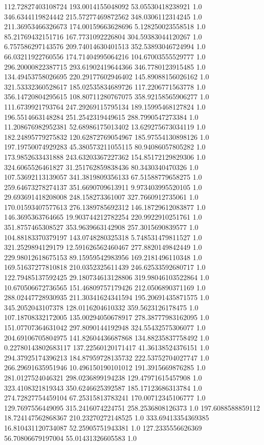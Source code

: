 112.72827403108724	193.0014155048092	53.05530418238921	1.0
346.6344119824442	215.57277469872562	348.0306112314245	1.0
211.36953466326673	174.00159663628696	5.128250023558518	1.0
85.21769432151716	167.7731092226804	304.59383044120267	1.0
6.757586297143576	209.74014630401513	352.53893046724994	1.0
66.03211922760556	174.71404995064216	104.67003555529777	1.0
296.20000822387715	293.61902419644366	346.7780123915485	1.0
134.49453758026695	220.29177602946402	145.89088156026162	1.0
321.53332360528617	185.02535834689726	117.2206771563778	1.0
356.14720804295615	108.80711280767075	358.92158565906277	1.0
111.6739921793764	247.29269115795134	189.15995468127824	1.0
196.5514663148284	251.2542319449615	288.7990547273384	1.0
11.208676982952381	52.68986175013402	13.629275673034119	1.0
182.24895779275832	120.62872769054967	185.97554130898126	1.0
197.19750074929283	45.380573211055115	80.94086057805282	1.0
173.9852633431888	243.63203367227362	154.85172129829306	1.0
324.6065526461827	31.251762859838436	80.3430340470326	1.0
107.53692113139057	341.3819809356133	67.51588779658275	1.0
259.64673278274137	351.6690709613911	9.973403995520105	1.0
29.693691418208008	248.158273361007	327.7660912735061	1.0
170.01593407577613	276.1389785692312	146.18729612083877	1.0
146.3695363764665	19.903744212782254	220.9922910251761	1.0
351.8757465308527	353.9639663142908	257.3015690839577	1.0
104.88183370379197	143.0748280325318	5.748531479811527	1.0
321.2529894129179	12.591626562460467	277.8820149842449	1.0
229.98012618675153	89.15959542983956	169.2181496110348	1.0
169.51637277810818	210.0352325611439	246.62533592680717	1.0
122.79485137592425	29.180734613128806	319.98046103522864	1.0
10.670506672736565	151.46809757179426	212.0506890371169	1.0
288.02447728930935	211.30341624341594	195.20691435871575	1.0
345.2052043107378	128.0116204610332	359.5623126178475	1.0
107.18708332172005	135.00294050678917	278.38777983162095	1.0
151.07707364631042	297.8090144192948	324.55432575306077	1.0
204.69106705804975	141.82604436687868	134.88235837758492	1.0
0.22780143802683117	137.22560120171417	41.36138524376151	1.0
294.37925174396213	184.87959728135732	222.53752704027747	1.0
266.29691635951946	10.496150190101012	191.3915669876285	1.0
281.0127524046321	298.0236899194238	129.47971615457908	1.0
323.4108321819343	350.6246625392587	185.17123686313784	1.0
274.72827754459104	67.25315813783241	170.00712345106777	1.0
129.7697556449095	315.2416074224751	258.2536808126373	1.0
197.6088588859112	18.724147562868367	210.23270272148525	1.0
333.69413354369385	16.810431120734087	52.25905751943381	1.0
127.2335556626369	56.70806679197004	55.01431326605583	1.0
